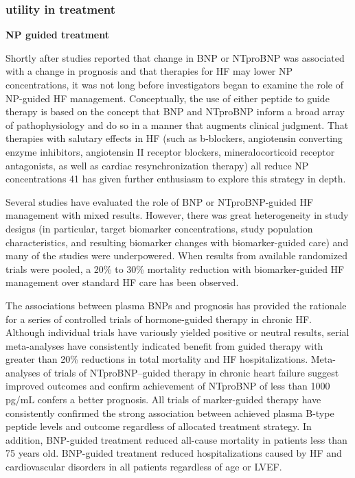 \documentclass[14pt,a4paper,onecolumn]{extarticle}
\begin{document}
\subsubsection{utility in treatment}
	\textbf{NP guided treatment}

Shortly after studies reported that change in BNP or NTproBNP was associated with a change in prognosis and that therapies for HF may lower NP concentrations, it was not long before investigators began to examine the role of NP-guided HF management. Conceptually, the use of either peptide to guide therapy is based on the concept that BNP and NTproBNP inform a broad array of pathophysiology and do so in a manner that augments clinical judgment. That therapies with salutary effects in HF (such as b-blockers, angiotensin converting enzyme inhibitors, angiotensin II receptor blockers, mineralocorticoid receptor antagonists, as well as cardiac resynchronization therapy) all reduce NP concentrations 41 has given further enthusiasm to explore this strategy in depth. \citep{Gaggin2013}

Several studies have evaluated the role of BNP or NTproBNP-guided HF management with mixed results. However, there was great heterogeneity in study designs (in particular, target biomarker concentrations, study population characteristics, and resulting biomarker changes with biomarker-guided care) and many of the studies were underpowered. When results from available randomized trials were pooled, a 20\% to 30\% mortality reduction with biomarker-guided HF management over standard HF care has been observed. \citep{Porapakkham2010}

The associations between plasma BNPs and prognosis has provided the rationale for a series of controlled trials of hormone-guided therapy in chronic HF. Although individual trials have variously yielded positive or neutral results, serial meta-analyses have consistently indicated benefit from guided therapy with greater than 20\% reductions in total mortality and HF hospitalizations. Meta-analyses of trials of NTproBNP–guided therapy in chronic heart failure suggest improved outcomes and confirm achievement of NTproBNP of less than 1000 pg/mL confers a better prognosis. All trials of marker-guided therapy have consistently confirmed the strong association between achieved plasma B-type  peptide levels and outcome regardless of allocated treatment strategy. In addition, BNP-guided treatment reduced all-cause mortality in patients less than 75 years old. BNP-guided treatment reduced hospitalizations caused by HF and cardiovascular disorders in all patients regardless of age or LVEF. \citep{Troughton2014} %
\end{document}
